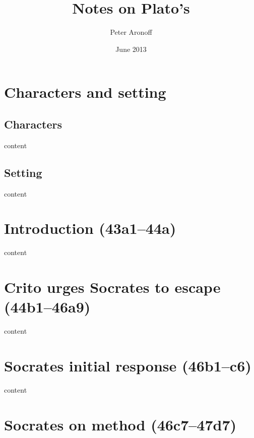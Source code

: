 \documentclass[11pt]{article}
\begin{document}
\begin{titlepage}
\title{Notes on Plato's }
\author{Peter Aronoff}
\date{June 2013}
\maketitle
\end{titlepage}

\section{Characters and setting}

\subsection{Characters}

content

\subsection{Setting}

content

\section{Introduction (43a1--44a)}

content

\section{Crito urges Socrates to escape (44b1--46a9)}

content

\section{Socrates initial response (46b1--c6)}

content

\section{Socrates on method (46c7--47d7)}
\end{document}
